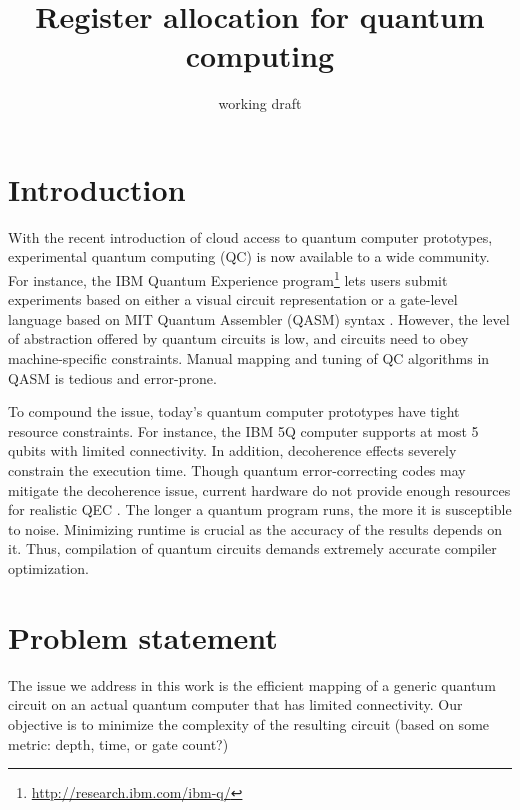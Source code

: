 \documentclass[11pt,a4paper]{article}
\title{Register allocation for quantum computing}
\author{working draft}
\begin{document}
\maketitle

\section{Introduction}

With the recent introduction of cloud access to quantum computer prototypes,
experimental quantum computing (QC) is now available to a wide community.
For instance, the IBM Quantum Experience program\footnote{\url{http://research.ibm.com/ibm-q/}} lets users submit experiments based on either a visual circuit representation or a gate-level language based on MIT Quantum Assembler (QASM) syntax \cite{Cross17,Svore06}.
However, the level of abstraction offered by quantum circuits is low, and circuits need to obey machine-specific constraints.
Manual mapping and tuning of QC algorithms in QASM is tedious and error-prone.

To compound the issue, today's quantum computer prototypes have tight resource constraints. For instance, the IBM 5Q computer supports at most 5 qubits with limited connectivity. In addition, decoherence effects severely constrain the execution time. Though quantum error-correcting codes may mitigate the decoherence issue, current hardware do not provide enough resources for realistic QEC \cite{Cross17}.
The longer a quantum program runs, the more it is susceptible to noise. Minimizing runtime is crucial as the accuracy of the results depends on it.
Thus, compilation of quantum circuits demands extremely accurate compiler optimization.

\section{Problem statement}

The issue we address in this work is the efficient mapping of a generic quantum circuit on an actual quantum computer that has limited connectivity.
Our objective is to minimize the complexity of the resulting circuit (based on some metric: depth, time, or gate count?)
\end{document}
